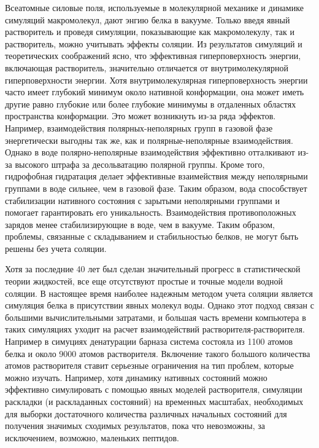 Всеатомные силовые поля, используемые в молекулярной механике и динамике симуляций макромолекул, дают энгию белка в вакууме. Только введя явный растворитель и проведя симуляции, показывающие как макромолекулу, так и растворитель, можно учитывать эффекты соляции. Из результатов симуляций и теоретических соображений ясно, что эффективная гиперповерхность энергии, включающая растворитель, значительно отличается от внутримолекулярной гиперповерхности энергии. Хотя внутримолекулярная гиперповерхность энергии часто имеет глубокий минимум около нативной конформации, она может иметь другие равно глубокие или более глубокие минимумы в отдаленных областях пространства конформации. Это может возникнуть из-за ряда эффектов. Например, взаимодействия полярных-неполярных групп в газовой фазе энергетически выгодны так же, как и полярные-неполярные взаимодействия. Однако в воде полярно-неполярные взаимодействия эффективно отталкивают из-за высокого штрафа за десольватацию полярной группы. Кроме того, гидрофобная гидратация делает эффективные взаимействия между неполярными группами в воде сильнее, чем в газовой фазе. Таким образом, вода способствует стабилизации нативного состояния с зарытыми неполярными группами и помогает гарантировать его уникальность. Взаимодействия противоположных зарядов менее стабилизирующие в воде, чем в вакууме. Таким образом, проблемы, связанные с складыванием и стабильностью белков, не могут быть решены без учета соляции.

Хотя за последние 40 лет был сделан значительный прогресс в статистической теории жидкостей, все еще отсутствуют простые и точные модели водной соляции. В настоящее время наиболее надежным методом учета соляции является симуляция белка в присутствии явных молекул воды. Однако этот подход связан с большими вычислительными затратами, и большая часть времени компьютера в таких симуляциях уходит на расчет взаимодействий растворителя-растворителя. Например в симуциях денатурации барназа система состояла из 1100 атомов белка и около 9000 атомов растворителя. Включение такого большого количества атомов растворителя ставит серьезные ограничения на тип проблем, которые можно изучать. Например, хотя динамику нативных состояний можно эффективно симулировать с помощью явных моделей растворителя, симуляции раскладки (и раскладанных состояний) на временных масштабах, необходимых для выборки достаточного количества различных начальных состояний для получения значимых сходимых результатов, пока что невозможны, за исключением, возможно, маленьких пептидов.

